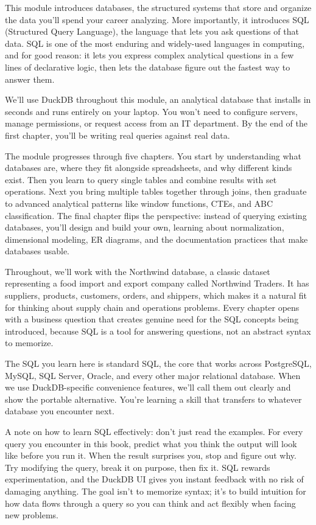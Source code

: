 \documentclass[
  letterpaper,
  DIV=11,
  numbers=noendperiod]{scrreprt}
\begin{document}
This module introduces databases, the structured systems that store and
organize the data you'll spend your career analyzing. More importantly,
it introduces SQL (Structured Query Language), the language that lets
you ask questions of that data. SQL is one of the most enduring and
widely-used languages in computing, and for good reason: it lets you
express complex analytical questions in a few lines of declarative
logic, then lets the database figure out the fastest way to answer them.

We'll use DuckDB throughout this module, an analytical database that
installs in seconds and runs entirely on your laptop. You won't need to
configure servers, manage permissions, or request access from an IT
department. By the end of the first chapter, you'll be writing real
queries against real data.

The module progresses through five chapters. You start by understanding
what databases are, where they fit alongside spreadsheets, and why
different kinds exist. Then you learn to query single tables and combine
results with set operations. Next you bring multiple tables together
through joins, then graduate to advanced analytical patterns like window
functions, CTEs, and ABC classification. The final chapter flips the
perspective: instead of querying existing databases, you'll design and
build your own, learning about normalization, dimensional modeling, ER
diagrams, and the documentation practices that make databases usable.

Throughout, we'll work with the Northwind database, a classic dataset
representing a food import and export company called Northwind Traders.
It has suppliers, products, customers, orders, and shippers, which makes
it a natural fit for thinking about supply chain and operations
problems. Every chapter opens with a business question that creates
genuine need for the SQL concepts being introduced, because SQL is a
tool for answering questions, not an abstract syntax to memorize.

The SQL you learn here is standard SQL, the core that works across
PostgreSQL, MySQL, SQL Server, Oracle, and every other major relational
database. When we use DuckDB-specific convenience features, we'll call
them out clearly and show the portable alternative. You're learning a
skill that transfers to whatever database you encounter next.

A note on how to learn SQL effectively: don't just read the examples.
For every query you encounter in this book, predict what you think the
output will look like before you run it. When the result surprises you,
stop and figure out why. Try modifying the query, break it on purpose,
then fix it. SQL rewards experimentation, and the DuckDB UI gives you
instant feedback with no risk of damaging anything. The goal isn't to
memorize syntax; it's to build intuition for how data flows through a
query so you can think and act flexibly when facing new problems.
\end{document}
